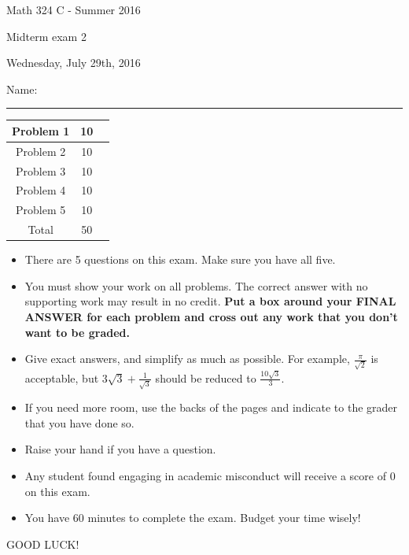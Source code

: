 \documentclass[12 pt]{report}
\begin{document}
\noindent \vfill \noindent \large

\centerline{Math 324 C  - Summer 2016}

\centerline{Midterm exam 2}

\centerline{Wednesday, July 29th, 2016}

\normalsize

\vfill
\medskip
Name: \rule{10cm}{1pt}

\bigskip

\vfill
\begin{center}
{\large
\begin{tabular}{||c|c|r||}
\hline Problem 1 & 10 & \hspace{10mm} \hfill \\
\hline Problem 2 & 10  & \hspace{10mm} \hfill \\
\hline Problem 3 & 10 & \hspace{10mm} \hfill \\
\hline Problem 4 & 10  & \hspace{10mm} \hfill \\
\hline Problem 5 & 10  & \hspace{10mm} \hfill \\
\hline Total & 50 & \hspace{10mm} \hfill \\
\hline
\end{tabular}
}
\end{center}
\vfill
\begin{itemize}
\item There are 5 questions on this exam. Make sure you have all five.
\item You must show your work on all problems.  The correct answer
with no supporting work may result in no credit. \textbf{Put a box
around your FINAL ANSWER for each problem and cross out any work
that you don't want to be graded.} 
\item Give exact answers, and simplify as much as possible. 
For example, $\frac{\pi}{\sqrt{2}}$ is acceptable, but $3\sqrt{3}+\frac{1}{\sqrt{3}}$
should be reduced to $\frac{10\sqrt{3}}{3}$.   

\item If you need more room, use the backs
of the pages and indicate to the grader that you have done so.
\item Raise your hand if you have a question.
\item Any student found engaging in academic misconduct will receive
a score of 0 on this exam.
\item You have 60 minutes to complete the exam.  Budget your time wisely! \\
\end{itemize}
\vfill
\begin{center}GOOD LUCK!\end{center}
\end{document}
